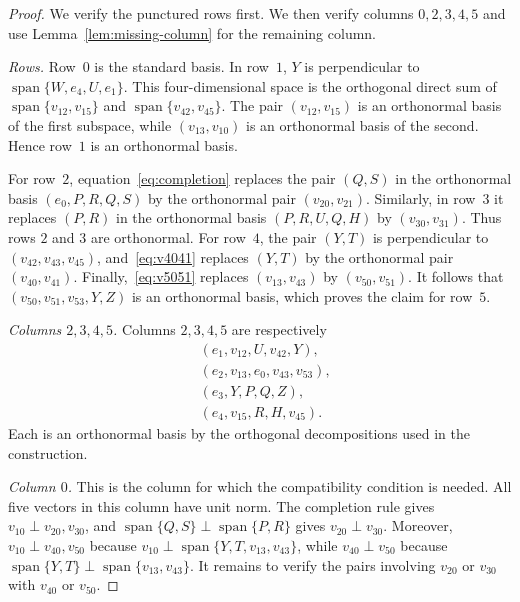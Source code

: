 \documentclass[10pt,a4paper]{amsart}
\newcommand{\spn}{\operatorname{span}}
\begin{document}
\begin{proof}
We verify the punctured rows first.  We then verify columns $0,2,3,4,5$ and
use Lemma~\ref{lem:missing-column} for the remaining column.

\emph{Rows.}
Row~$0$ is the standard basis.  In row~$1$, $Y$ is perpendicular
to $\spn\{W,e_4,U,e_1\}$.  This four-dimensional space is the orthogonal
direct sum of $\spn\{v_{12},v_{15}\}$ and
$\spn\{v_{42},v_{45}\}$.  The pair $(v_{12},v_{15})$ is an orthonormal basis
of the first subspace, while $(v_{13},v_{10})$ is an orthonormal basis of the
second.  Hence row~$1$ is an orthonormal basis.

For row~$2$, equation~\eqref{eq:completion} replaces the pair $(Q,S)$ in the
orthonormal basis $(e_0,P,R,Q,S)$ by the orthonormal pair $(v_{20},v_{21})$.
Similarly, in row~$3$ it replaces $(P,R)$ in the orthonormal basis
$(P,R,U,Q,H)$ by $(v_{30},v_{31})$.  Thus rows $2$ and $3$ are orthonormal.
For row~$4$, the pair $(Y,T)$ is perpendicular to
$(v_{42},v_{43},v_{45})$, and~\eqref{eq:v4041} replaces $(Y,T)$ by the
orthonormal pair $(v_{40},v_{41})$.  Finally,~\eqref{eq:v5051} replaces
$(v_{13},v_{43})$ by $(v_{50},v_{51})$.  It follows that
$(v_{50},v_{51},v_{53},Y,Z)$ is an orthonormal basis, which proves the claim
for row~$5$.

\emph{Columns $2,3,4,5$.}
Columns $2,3,4,5$ are respectively
\begin{align*}
&(e_1,v_{12},U,v_{42},Y),\\
&(e_2,v_{13},e_0,v_{43},v_{53}),\\
&(e_3,Y,P,Q,Z),\\
&(e_4,v_{15},R,H,v_{45}).
\end{align*}
Each is an orthonormal basis by the orthogonal decompositions used in the
construction.

\emph{Column $0$.}
This is the column for which the compatibility condition is needed.  All five
vectors in this column have unit norm.  The completion rule gives
$v_{10}\perp v_{20},v_{30}$, and
$\spn\{Q,S\}\perp\spn\{P,R\}$ gives $v_{20}\perp v_{30}$.  Moreover,
$v_{10}\perp v_{40},v_{50}$ because
$v_{10}\perp\spn\{Y,T,v_{13},v_{43}\}$, while
$v_{40}\perp v_{50}$ because
$\spn\{Y,T\}\perp\spn\{v_{13},v_{43}\}$.  It remains to verify the pairs
involving $v_{20}$ or $v_{30}$ with $v_{40}$ or $v_{50}$.


\end{proof}
\end{document}
